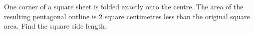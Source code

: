 One corner of a square sheet is folded exactly onto the centre. The area of the resulting pentagonal outline is $2$ square centimetres less than the original square area. Find the square side length.
